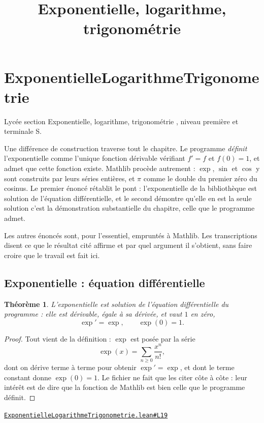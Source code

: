 \documentclass[11pt,a4paper]{article}
\title{Exponentielle, logarithme, trigonométrie}
\date{}
\theoremstyle{definition}
\theoremstyle{plain}
\newtheorem{theoreme}{Théorème}
\newcommand{\source}[2]{\par\smallskip\noindent\hfill{\footnotesize\href{#1}{\texttt{#2}}}\par\smallskip}
\begin{document}
\maketitle
\sloppy

\section{ExponentielleLogarithmeTrigonometrie}

\noindent
Lycée \textemdash{} section \og{} Exponentielle, logarithme, trigonométrie \fg{}, niveau
première et terminale S.

\medskip\noindent
Une différence de construction traverse tout le chapitre. Le programme \emph{définit}
l'exponentielle comme l'unique fonction dérivable vérifiant $f' = f$ et $f(0) = 1$, et
admet que cette fonction existe. Mathlib procède autrement : $\exp$, $\sin$ et $\cos$ y
sont construits par leurs séries entières, et $\pi$ comme le double du premier zéro du
cosinus. Le premier énoncé rétablit le pont : l'exponentielle de la bibliothèque est
solution de l'équation différentielle, et le second démontre qu'elle en est la seule
solution \textemdash{} c'est la démonstration substantielle du chapitre, celle que le
programme admet.

\medskip\noindent
Les autres énoncés sont, pour l'essentiel, empruntés à Mathlib. Les transcriptions disent
ce que le résultat cité affirme et par quel argument il s'obtient, sans faire croire que le
travail est fait ici.

\subsection{Exponentielle : équation différentielle}

\begin{theoreme}
L'exponentielle est solution de l'équation différentielle du programme : elle est
dérivable, égale à sa dérivée, et vaut $1$ en zéro,
\[ \exp' = \exp, \qquad \exp(0) = 1 . \]
\end{theoreme}

\begin{proof}
Tout vient de la définition : $\exp$ est posée par la série
\[ \exp(x) = \sum_{n \ge 0} \frac{x^{n}}{n!} , \]
dont on dérive terme à terme pour obtenir $\exp' = \exp$, et dont le terme constant donne
$\exp(0) = 1$. Le fichier ne fait que les citer côte à côte : leur intérêt est de dire que
la fonction de Mathlib est bien celle que le programme définit.
\end{proof}
\source{https://github.com/Commutator-IO/learn-lean/blob/main/courses/02-lycee/05-exponentielle-logarithme-trigonometrie/ExponentielleLogarithmeTrigonometrie.lean\#L19}{ExponentielleLogarithmeTrigonometrie.lean\#L19}
\end{document}
